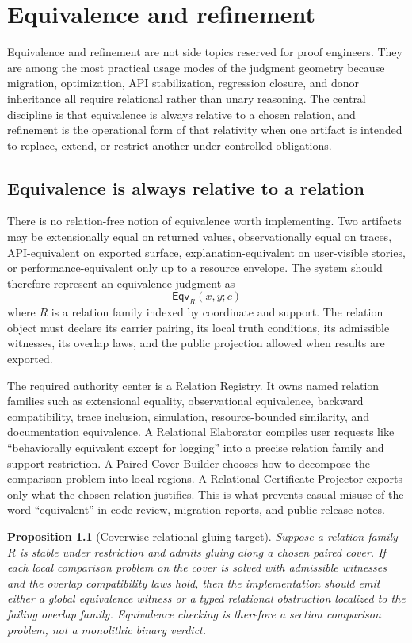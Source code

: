 \documentclass[11pt]{report}
\newtheorem{proposition}[definition]{Proposition}
\newcommand{\Eqv}{\mathsf{Eqv}}
\begin{document}
\chapter{Equivalence and refinement}
Equivalence and refinement are not side topics reserved for proof engineers. They are among the most practical usage modes of the judgment geometry because migration, optimization, API stabilization, regression closure, and donor inheritance all require relational rather than unary reasoning. The central discipline is that equivalence is always relative to a chosen relation, and refinement is the operational form of that relativity when one artifact is intended to replace, extend, or restrict another under controlled obligations.
\section{Equivalence is always relative to a relation}
There is no relation-free notion of equivalence worth implementing. Two artifacts may be extensionally equal on returned values, observationally equal on traces, API-equivalent on exported surface, explanation-equivalent on user-visible stories, or performance-equivalent only up to a resource envelope. The system should therefore represent an equivalence judgment as
\[
\Eqv_R(x,y;c)
\]
where $R$ is a relation family indexed by coordinate and support. The relation object must declare its carrier pairing, its local truth conditions, its admissible witnesses, its overlap laws, and the public projection allowed when results are exported.

The required authority center is a Relation Registry. It owns named relation families such as extensional equality, observational equivalence, backward compatibility, trace inclusion, simulation, resource-bounded similarity, and documentation equivalence. A Relational Elaborator compiles user requests like ``behaviorally equivalent except for logging'' into a precise relation family and support restriction. A Paired-Cover Builder chooses how to decompose the comparison problem into local regions. A Relational Certificate Projector exports only what the chosen relation justifies. This is what prevents casual misuse of the word ``equivalent'' in code review, migration reports, and public release notes.

\begin{proposition}[Coverwise relational gluing target]
Suppose a relation family $R$ is stable under restriction and admits gluing along a chosen paired cover. If each local comparison problem on the cover is solved with admissible witnesses and the overlap compatibility laws hold, then the implementation should emit either a global equivalence witness or a typed relational obstruction localized to the failing overlap family. Equivalence checking is therefore a section comparison problem, not a monolithic binary verdict.
\end{proposition}
\end{document}
